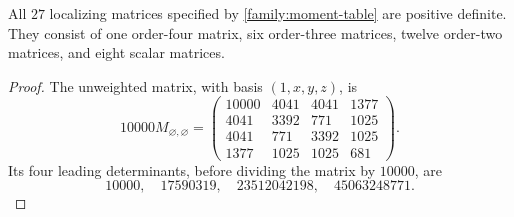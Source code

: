 \begin{proposition}
\label{family:localizing-tables}
All $27$ localizing matrices specified by \cref{family:moment-table} are
positive definite. They consist of one order-four matrix, six order-three
matrices, twelve order-two matrices, and eight scalar matrices.
\end{proposition}

\begin{proof}
The unweighted matrix, with basis $(1,x,y,z)$, is
\begin{equation}
\label{family:orderfour}
10000M_{\varnothing,\varnothing}
=\begin{pmatrix}
10000&4041&4041&1377\\
4041&3392&771&1025\\
4041&771&3392&1025\\
1377&1025&1025&681
\end{pmatrix}.
\end{equation}
Its four leading determinants, before dividing the matrix by $10000$, are
\[
10000,\quad 17590319,\quad 23512042198,\quad 45063248771.
\]


\end{proof}
